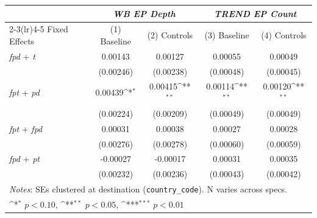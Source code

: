 {
\def\sym#1{\ifmmode^{#1}\else\(^{#1}\)\fi}
\begin{tabular}{lcccc}
\toprule
 & \multicolumn{2}{c}{\textit{WB EP Depth}} & \multicolumn{2}{c}{\textit{TREND EP Count}} \\
\cmidrule(lr){2-3}\cmidrule(lr){4-5}
Fixed Effects & (1) Baseline & (2) Controls & (3) Baseline & (4) Controls \\
\midrule
\textit{fpd} + \textit{t} & 0.00143 & 0.00127 & 0.00055 & 0.00049 \\
 & (0.00246) & (0.00238) & (0.00048) & (0.00045) \\
\addlinespace
\textit{fpt} + \textit{pd} & 0.00439\sym{*} & 0.00415\sym{**} & 0.00114\sym{**} & 0.00120\sym{**} \\
 & (0.00224) & (0.00209) & (0.00049) & (0.00049) \\
\addlinespace
\textit{fpt} + \textit{fpd} & 0.00031 & 0.00038 & 0.00027 & 0.00028 \\
 & (0.00276) & (0.00278) & (0.00060) & (0.00059) \\
\addlinespace
\textit{fpd} + \textit{pt} & -0.00027 & -0.00017 & 0.00031 & 0.00035 \\
 & (0.00232) & (0.00236) & (0.00043) & (0.00042) \\
\midrule
\multicolumn{5}{l}{\footnotesize \textit{Notes}: SEs clustered at destination (\texttt{country\_code}). N varies across specs.} \\
\multicolumn{5}{l}{\footnotesize \sym{*} \(p<0.10\), \sym{**} \(p<0.05\), \sym{***} \(p<0.01\)} \\
\bottomrule
\end{tabular}
}
